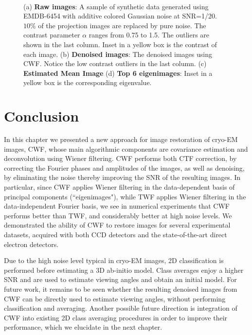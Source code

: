 \begin{figure}[]
\centering
{}
\quad
{} \\
\quad
{}
\caption{(a) \textbf{Raw images}: 
A sample of synthetic 
data 
generated using EMDB-6454 with additive colored Gaussian noise at SNR=1/20.\ $10\%$ of
the projection images are replaced by pure noise. The contrast parameter $\alpha$ ranges from 0.75 to 1.5. The outliers are shown in the last column. Inset 
in a yellow box is the contrast of each image.
(b) \textbf{Denoised images}: 
The denoised images using CWF. Notice the low contrast outliers in the last column. (c) \textbf{Estimated Mean Image}
(d) \textbf{Top 6 eigenimages}: 
Inset in a yellow box is the corresponding eigenvalue.}
\end{figure}

\section{Conclusion}
In this chapter we presented a new approach for image restoration of cryo-EM images, CWF, whose
main algorithmic components are covariance estimation and deconvolution using Wiener filtering.
CWF performs both CTF correction, by correcting the Fourier phases and amplitudes of the images, 
as well as denoising, by eliminating the noise thereby improving the SNR of the resulting images.
In particular, since CWF applies Wiener filtering in the data-dependent basis of principal components (``eigenimages"),
while TWF applies Wiener filtering in the data-independent Fourier basis, we see
in numerical experiments that CWF performs better than TWF, and considerably better at high noise levels.
We demonstrated the ability of CWF to restore images for several 
experimental datasets, acquired with both CCD detectors and the state-of-the-art direct electron detectors.

Due to the high noise level typical in cryo-EM images, 2D classification is performed before estimating a 3D ab-initio model. Class averages 
enjoy a higher SNR and are used to estimate viewing angles and obtain an initial model.
For future work, it remains to be seen whether the resulting denoised images from CWF can be directly used to estimate viewing angles,
without performing classification and averaging.
Another possible future direction is integration of CWF into existing 2D class averaging procedures in order to improve their performance, which we elucidate in the next chapter.


